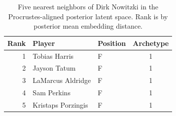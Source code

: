 \begin{table}[htbp]
  \centering\small
  \begin{tabular}{rllc}
    \toprule
    Rank & Player & Position & Archetype \\
    \midrule
    1 & Tobias Harris & F & 1 \\
    2 & Jayson Tatum & F & 1 \\
    3 & LaMarcus Aldridge & F & 1 \\
    4 & Sam Perkins & F & 1 \\
    5 & Kristaps Porzingis & F & 1 \\
    \bottomrule
  \end{tabular}
  \caption{Five nearest neighbors of Dirk Nowitzki in the Procrustes-aligned posterior latent space. Rank is by posterior mean embedding distance.}
  \label{tab:Dirk_Nowitzki_neighbors}
\end{table}

